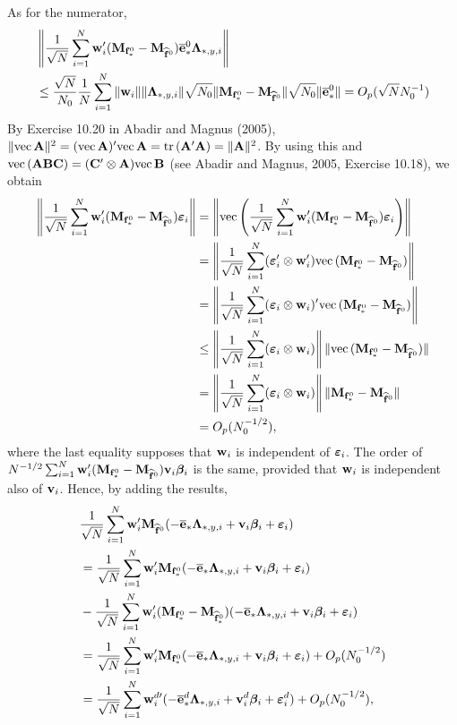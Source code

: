\documentclass[12pt,fleqn]{article}
\begin{document}
As for the numerator,
\begin{align}
& \left\|\frac{1}{\sqrt{N}}\sum_{i=1}^N \mathbf{w}_{i}'(\mathbf{M}_{\mathbf{f}_*^0} - \mathbf{M}_{\widehat{\mathbf{f}}^0})\overline{\mathbf{e}}_{*}^0\boldsymbol{\Lambda}_{*,y,i}\right\|\notag\\
 & \leq \frac{\sqrt{N}}{N_0}\frac{1}{N}\sum_{i=1}^N \| \mathbf{w}_{i}\|\|\boldsymbol{\Lambda}_{*,y,i}\|\sqrt{N_0}\|\mathbf{M}_{\mathbf{f}_*^0} - \mathbf{M}_{\widehat{\mathbf{f}}^0}\|\sqrt{N_0}\|\overline{\mathbf{e}}_{*}^0\|  = O_p(\sqrt{N}N_0^{-1})
\end{align}
By Exercise 10.20 in Abadir and Magnus (2005), $\|\mathrm{vec}\, \mathbf{A}\|^2 = (\mathrm{vec}\, \mathbf{A})'\mathrm{vec}\, \mathbf{A} = \mathrm{tr}\, (\mathbf{A}'\mathbf{A}) = \|\mathbf{A}\|^2$. By using this and $\mathrm{vec} \,(\mathbf{A}\mathbf{B}\mathbf{C}) = (\mathbf{C}' \otimes \mathbf{A})\mathrm{vec} \,\mathbf{B}$ (see Abadir and Magnus, 2005, Exercise 10.18), we obtain
\begin{align}
\left\|\frac{1}{\sqrt{N}}\sum_{i=1}^N \mathbf{w}_{i}'(\mathbf{M}_{\mathbf{f}_*^0} - \mathbf{M}_{\widehat{\mathbf{f}}^0})\boldsymbol{\varepsilon}_{i}\right\| & = \left\|\mathrm{vec}\left( \frac{1}{\sqrt{N}}\sum_{i=1}^N \mathbf{w}_{i}'(\mathbf{M}_{\mathbf{f}_*^0} - \mathbf{M}_{\widehat{\mathbf{f}}^0})\boldsymbol{\varepsilon}_{i} \right) \right\| \notag\\
& = \left\|\frac{1}{\sqrt{N}}\sum_{i=1}^N (\boldsymbol{\varepsilon}_{i}'\otimes \mathbf{w}_{i}') \mathrm{vec}\,(\mathbf{M}_{\mathbf{f}_*^0} - \mathbf{M}_{\widehat{\mathbf{f}}^0}) \right\| \notag\\
& = \left\|\frac{1}{\sqrt{N}}\sum_{i=1}^N (\boldsymbol{\varepsilon}_{i}\otimes \mathbf{w}_{i})' \mathrm{vec}\,(\mathbf{M}_{\mathbf{f}_*^0} - \mathbf{M}_{\widehat{\mathbf{f}}^0})  \right\| \notag\\
& \leq \left\|\frac{1}{\sqrt{N}}\sum_{i=1}^N (\boldsymbol{\varepsilon}_{i}\otimes \mathbf{w}_{i})\right\| \|\mathrm{vec}\,(\mathbf{M}_{\mathbf{f}_*^0} - \mathbf{M}_{\widehat{\mathbf{f}}^0})  \| \notag\\
& = \left\|\frac{1}{\sqrt{N}}\sum_{i=1}^N (\boldsymbol{\varepsilon}_{i}\otimes \mathbf{w}_{i})\right\| \| \mathbf{M}_{\mathbf{f}_*^0} - \mathbf{M}_{\widehat{\mathbf{f}}^0} \| \notag\\
& = O_p(N_0^{-1/2}),
\end{align}
where the last equality supposes that $\mathbf{w}_{i}$ is independent of $\boldsymbol{\varepsilon}_{i}$. The order of $N^{-1/2}\sum_{i=1}^N \mathbf{w}_{i}'(\mathbf{M}_{\mathbf{f}_*^0} - \mathbf{M}_{\widehat{\mathbf{f}}^0})\mathbf{v}_i\boldsymbol{\beta}_i$ is the same, provided that $\mathbf{w}_{i}$ is independent also of $\mathbf{v}_i$. Hence, by adding the results,
\begin{align}
& \frac{1}{\sqrt{N}}\sum_{i=1}^N \mathbf{w}_{i}' \mathbf{M}_{\widehat{\mathbf{f}}^0}(-\overline{\mathbf{e}}_{*}\boldsymbol{\Lambda}_{*,y,i}  + \mathbf{v}_i\boldsymbol{\beta}_i +  \boldsymbol{\varepsilon}_{i}) \notag\\
& = \frac{1}{\sqrt{N}}\sum_{i=1}^N \mathbf{w}_{i}' \mathbf{M}_{\mathbf{f}_*^0}(-\overline{\mathbf{e}}_{*}\boldsymbol{\Lambda}_{*,y,i}  + \mathbf{v}_i\boldsymbol{\beta}_i +  \boldsymbol{\varepsilon}_{i}) \notag\\
& - \frac{1}{\sqrt{N}}\sum_{i=1}^N \mathbf{w}_{i}'(\mathbf{M}_{\mathbf{f}_*^0}- \mathbf{M}_{\widehat{\mathbf{f}}_*^0})(-\overline{\mathbf{e}}_{*}\boldsymbol{\Lambda}_{*,y,i}  + \mathbf{v}_i\boldsymbol{\beta}_i +  \boldsymbol{\varepsilon}_{i}) \notag\\
& = \frac{1}{\sqrt{N}}\sum_{i=1}^N \mathbf{w}_{i}' \mathbf{M}_{\mathbf{f}_*^0}(-\overline{\mathbf{e}}_{*}\boldsymbol{\Lambda}_{*,y,i}  + \mathbf{v}_i\boldsymbol{\beta}_i +  \boldsymbol{\varepsilon}_{i}) +  O_p(N_0^{-1/2})\notag\\
& = \frac{1}{\sqrt{N}}\sum_{i=1}^N \mathbf{w}_{i}^{d\prime} (-\overline{\mathbf{e}}_{*}^d\boldsymbol{\Lambda}_{*,y,i}  + \mathbf{v}_i^d\boldsymbol{\beta}_i +  \boldsymbol{\varepsilon}_{i}^d) +  O_p(N_0^{-1/2}),
\end{align}
\end{document}
